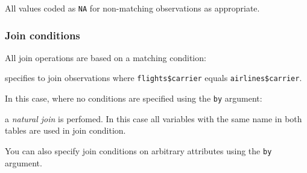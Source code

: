 \documentclass[]{article}
\newenvironment{Shaded}{\begin{snugshade}}{\end{snugshade}}
\newcommand{\KeywordTok}[1]{\textcolor[rgb]{0.13,0.29,0.53}{\textbf{{#1}}}}
\newcommand{\DataTypeTok}[1]{\textcolor[rgb]{0.13,0.29,0.53}{{#1}}}
\newcommand{\StringTok}[1]{\textcolor[rgb]{0.31,0.60,0.02}{{#1}}}
\newcommand{\NormalTok}[1]{{#1}}
\theoremstyle{definition}
\theoremstyle{definition}
\theoremstyle{remark}
\begin{document}
\begin{Shaded}
\end{Shaded}

All values coded as \texttt{NA} for non-matching observations as
appropriate.

\subsubsection{Join conditions}\label{join-conditions}

All join operations are based on a matching condition:

\begin{Shaded}
\end{Shaded}

specifies to join observations where \texttt{flights\$carrier} equals
\texttt{airlines\$carrier}.

In this case, where no conditions are specified using the \texttt{by}
argument:

\begin{Shaded}
\end{Shaded}

a \emph{natural join} is perfomed. In this case all variables with the
same name in both tables are used in join condition.

You can also specify join conditions on arbitrary attributes using the
\texttt{by} argument.

\begin{Shaded}
\end{Shaded}
\end{document}
